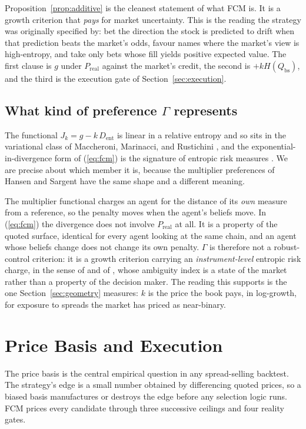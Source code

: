 \documentclass[11pt]{article}
\newcommand{\dent}{D_{\mathrm{ent}}}
\newcommand{\Preal}{P_{\mathrm{real}}}
\newcommand{\Qbs}{Q_{\mathrm{bs}}}
\begin{document}
Proposition~\ref{prop:additive} is the cleanest statement of what FCM is. It
is a growth criterion that \emph{pays} for market uncertainty. This is the
reading the strategy was originally specified by: bet the direction the stock
is predicted to drift when that prediction beats the market's odds, favour
names where the market's view is high-entropy, and take only bets whose fill
yields positive expected value. The first clause is $g$ under $\Preal$ against
the market's credit, the second is $+k H(\Qbs)$, and the third is the
execution gate of Section~\ref{sec:execution}.

\subsection{What kind of preference \texorpdfstring{$\Gamma$}{Gamma} represents}
\label{sec:hs}

The functional $J_k = g - k\,\dent$ is linear in a relative entropy and so sits
in the variational class of Maccheroni, Marinacci, and Rustichini
\cite{maccheroni2006}, and the exponential-in-divergence form of
(\ref{eq:fcm}) is the signature of entropic risk measures
\cite{follmer2002}. We are precise about which member it is, because the
multiplier preferences of Hansen and Sargent \cite{hansensargent2008} have the
same shape and a different meaning.

The multiplier functional charges an agent for the distance of its \emph{own}
measure from a reference, so the penalty moves when the agent's beliefs move.
In (\ref{eq:fcm}) the divergence does not involve $\Preal$ at all. It is a
property of the quoted surface, identical for every agent looking at the same
chain, and an agent whose beliefs change does not change its own penalty.
$\Gamma$ is therefore not a robust-control criterion: it is a growth criterion
carrying an \emph{instrument-level} entropic risk charge, in the sense of
\cite{follmer2002} and of \cite{mercurio2020binary}, whose ambiguity index is
a state of the market rather than a property of the decision maker. The reading
this supports is the one Section~\ref{sec:geometry} measures: $k$ is the price
the book pays, in log-growth, for exposure to spreads the market has priced as
near-binary.

\section{Price Basis and Execution}
\label{sec:basis}

The price basis is the central empirical question in any spread-selling
backtest. The strategy's edge is a small number obtained by differencing
quoted prices, so a biased basis manufactures or destroys the edge before any
selection logic runs. FCM prices every candidate through three successive
ceilings and four reality gates.
\end{document}
